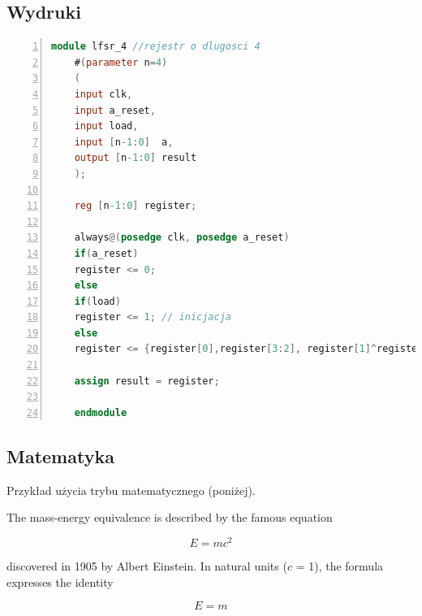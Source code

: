\documentclass[
    left=2.5cm,         %
    right=2.5cm,        %
    top=2.5cm,          %
    bottom=3cm,         %
    bindingoffset=6mm,  %
    nohyphenation=true %
]{eiti/eiti-thesis} %
\begin{document}
\subsection{Wydruki}
\begin{lstlisting}[label=lst:wydruk,caption={Testowy program w Verilog},language=Verilog,numbers=left]
	module lfsr_4 //rejestr o dlugosci 4
	#(parameter n=4)
	(
	input clk,
	input a_reset,
	input load,
	input [n-1:0]  a,
	output [n-1:0] result
	);
	
	reg [n-1:0] register;
	
	always@(posedge clk, posedge a_reset)
	if(a_reset)
	register <= 0;
	else 
	if(load)
	register <= 1; // inicjacja
	else
	register <= {register[0],register[3:2], register[1]^register[0]};
	
	assign result = register;
	
	endmodule
\end{lstlisting}

\subsection{Matematyka}
Przykład użycia trybu matematycznego (poniżej).

The mass-energy equivalence is described by the famous equation

$$E=mc^2$$ %

discovered in 1905 by Albert Einstein. 
In natural units ($c$ = 1), the formula expresses the identity %

\begin{equation} %
	E=m
\end{equation}
\end{document}

